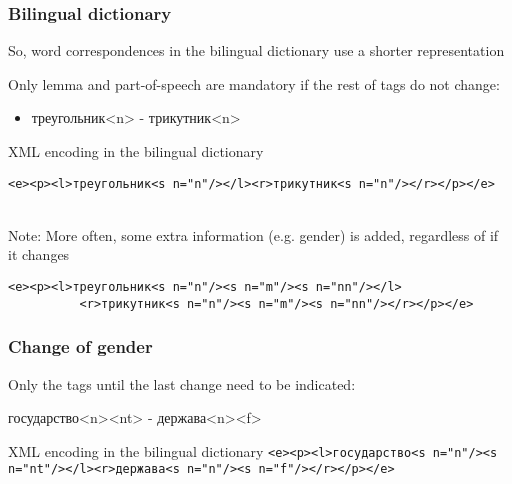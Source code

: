\documentclass[10pt,xetex]{beamer} %
\begin{document}
\begin{frame}
  \frametitle{Bilingual dictionary}

So, word correspondences in the bilingual dictionary use a shorter representation

\begin{block}{}

Only lemma and part-of-speech are mandatory if the rest of tags do not change:
\begin{itemize}
 \item треугольник<n> - трикутник<n>
\end{itemize}
\end{block}
\begin{block}{XML encoding in the bilingual dictionary}
~\\
\begin{center}
\begin{small}
{\tt  <e><p><l>треугольник<s n="n"/></l><r>трикутник<s n="n"/></r></p></e>}
\end{small}
\end{center}
~\\
Note: More often, some extra information (e.g. gender) is added, regardless of if it changes
~\\

\begin{center}
\begin{small}
{\tt  <e><p><l>треугольник<s n="n"/><s n="m"/><s n="nn"/></l> \\
      ~~~~~~~~~~<r>трикутник<s n="n"/><s n="m"/><s n="nn"/></r></p></e>}
\end{small}
\end{center}

\end{block}
\end{frame}

\begin{frame}
\frametitle{Change of gender}

\begin{block}{}
Only the tags until the last change need to be indicated:

\begin{center}
государство<n><nt> - держава<n><f>
\end{center}
\end{block}
\begin{block}{XML encoding in the bilingual dictionary}
{\tt <e><p><l>государство<s n="n"/><s n="nt"/></l><r>держава<s n="n"/><s n="f"/></r></p></e>}
\end{block}

\end{frame}
\end{document}
